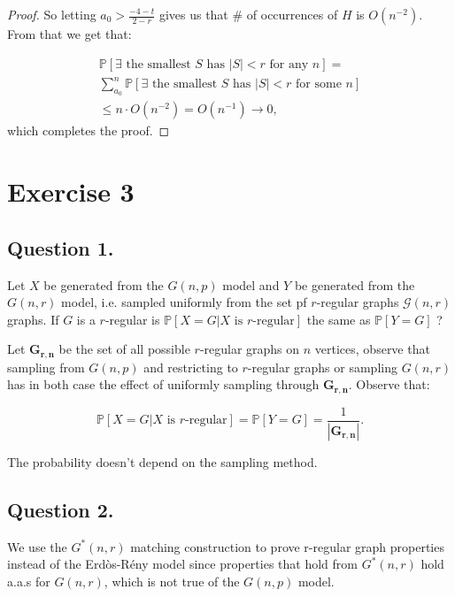 \documentclass[11pt]{article}
\begin{document}
\begin{proof}
    So letting $a_0 >  \frac{{-4-t}}{{2-r}}$ gives us that \# of occurrences of $H$ is $O(n^{-2})$. From that we get that:

    \begin{align*}
        \mathbb{P}\left[\text{$\exists$ the smallest $S$ has $|S|<r$ for any $n$}\right] = \\
        \sum_{a_0}^n  \mathbb{P} \left[\text{$\exists$ the smallest $S$ has $|S|<r$ for some $n$}\right] \\
        \leq n \cdot O(n^{-2}) = O(n^{-1}) \rightarrow 0,
    \end{align*}
    which completes the proof.
\end{proof}

\newpage

\section*{Exercise 3}

\subsection*{Question 1.} 
Let $X$ be generated from the $G(n,p)$ model and $Y$ be generated from the $G(n,r)$ model, i.e. sampled uniformly from the set pf $r$-regular graphs $\mathcal{G}(n,r)$ graphs. If $G$ is a $r$-regular is $\mathbb{P}\left[X=G|\text{$X$ is $r$-regular}\right]$ the same as  $\mathbb{P}\left[Y=G\right]$ ?
\BlankLine

Let $\bm{G_{r,n}}$ be the set of all possible $r$-regular graphs on $n$ vertices, observe that sampling from $G(n,p)$ and restricting to $r$-regular graphs or sampling $G(n,r)$ has in both case the effect of uniformly sampling through $\bm{G_{r,n}}$. Observe that:

\[ \mathbb{P}\left[X=G|\text{$X$ is $r$-regular}\right] = \mathbb{P}\left[Y=G\right] = \frac{1}{|\bm{G_{r,n}}|}. \] 

The probability doesn't depend on the sampling method.

\subsection*{Question 2.} 

We use the $G^*(n,r)$ matching construction to prove r-regular graph properties instead of the Erdòs-Rény model since properties that hold from $G^*(n,r)$ hold a.a.s for $G(n,r)$, which is not true of the $G(n,p)$ model.
\end{document}
